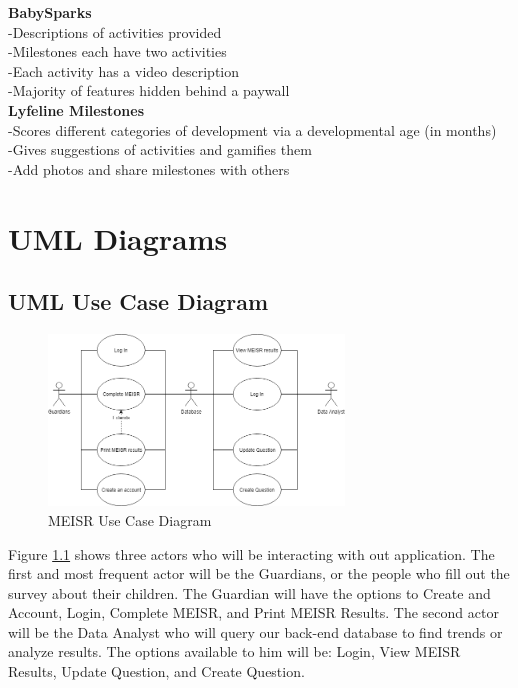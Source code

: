 \textbf{BabySparks}\\
	-Descriptions of activities provided\\
	-Milestones each have two activities\\
	-Each activity has a video description\\
	-Majority of features hidden behind a paywall\\

\textbf{Lyfeline Milestones}\\
-Scores different categories of development via a developmental age (in months)\\
-Gives suggestions of activities and gamifies them\\
-Add photos and share milestones with others\\
\label{Competitors}

\chapter{UML Diagrams}
\label{UML Diagrams}

\section{UML Use Case Diagram}

\begin{figure}[h]
  \centering
  \includegraphics[width=0.7\textwidth]{images/Use_Case_Diagram.png}
  \caption{MEISR Use Case Diagram}
  \label{fig:useCase}
\end{figure}

Figure \ref{fig:useCase} shows three actors who will be interacting with out application. The first and most frequent actor will be the Guardians, or the people who fill out the survey about their children. The Guardian will have the options to Create and Account, Login, Complete MEISR, and Print MEISR Results. The second actor will be the Data Analyst who will query our back-end database to find trends or analyze results. The options available to him will be: Login, View MEISR Results, Update Question, and Create Question.

